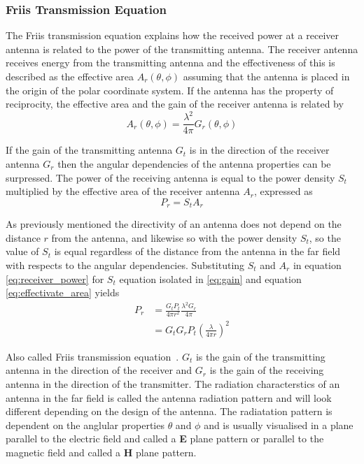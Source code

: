 \subsubsection{Friis Transmission Equation}
The Friis transmission equation explains how the received power at a receiver antenna is related to the power of the transmitting antenna. The receiver antenna receives energy from the transmitting antenna and the effectiveness of this is described as the effective area $A_r\left( \theta, \phi \right)$ assuming that the antenna is placed in the origin of the polar coordinate system. If the antenna has the property of reciprocity, the effective area and the gain of the receiver antenna is related by 
\begin{equation} \label{eq:effectivate_area}
    A_r \left( \theta, \phi \right) = \frac{\lambda^2}{4 \pi} G_r \left( \theta, \phi \right)
\end{equation}

If the gain of the transmitting antenna $G_t$ is in the direction of the receiver antenna $G_r$ then the angular dependencies of the antenna properties can be surpressed. The power of the receiving antenna is equal to the power density $S_t$ multiplied by the effective area of the receiver antenna $A_r$, expressed as
\begin{equation} \label{eq:receiver_power}
    P_r = S_t A_r
\end{equation} 

As previously mentioned the directivity of an antenna does not depend on the distance $r$ from the antenna, and likewise so with the power density $S_t$, so the value of $S_t$ is equal regardless of the distance from the antenna in the far field with respects to the angular dependencies. Substituting $S_t$ and $A_r$ in equation \ref{eq:receiver_power} for $S_t$ equation isolated in \ref{eq:gain} and equation \ref{eq:effectivate_area} yields
\begin{equation} \label{eq:friis}
    \begin{split}
        P_r & = \frac{G_t P_t}{4 \pi r^2} \frac{\lambda^2 G_r}{4 \pi} \\
        & = G_t  G_r P_t \left( \frac{\lambda}{4 \pi r} \right)^2
    \end{split}
\end{equation} 

Also called Friis transmission equation~\cite[pp. 8-10]{ant_eng_hk}. $G_t$ is the gain of the transmitting antenna in the direction of the receiver and $G_r$ is the gain of the receiving antenna in the direction of the transmitter. The radiation characterstics of an antenna in the far field is called the antenna radiation pattern and will look different depending on the design of the antenna. The radiatation pattern is dependent on the anglular properties $\theta$ and $\phi$ and is usually visualised in a plane parallel to the electric field and called a \textbf{E} plane pattern or parallel to the magnetic field and called a \textbf{H} plane pattern.

